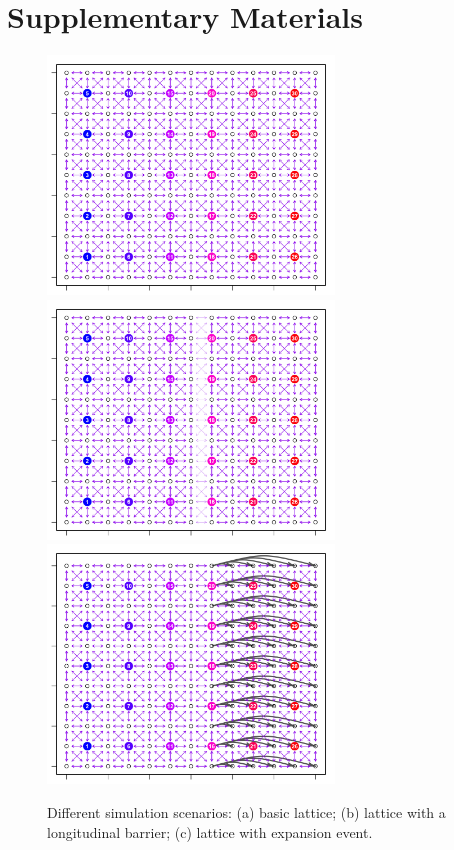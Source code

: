 \documentclass[12pt]{article}
\begin{document}
\newpage



\newpage


\section*{Supplementary Materials}

\begin{figure}
	\centering
			{\includegraphics[width=3in,height=2.5in]{figs/sims/basic_lattice.png}}
			{\includegraphics[width=3in,height=2.5in]{figs/sims/barrier_lattice.png}}
			{\includegraphics[width=3in,height=2.5in]{figs/sims/expansion_lattice.png}}
	\caption{Different simulation scenarios: (a) basic lattice; (b) lattice with a longitudinal barrier; (c) lattice with expansion event.}\label{sfig:sim_scenarios}
\end{figure}
\end{document}
